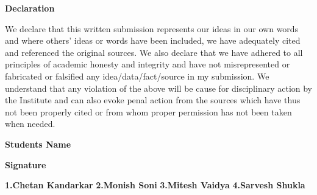 \newpage
\thispagestyle{empty}
\begin{center}
	\LARGE \textbf  {{Declaration}} 
\end{center}

\vspace{1.00cm}	
	We declare that this written submission represents our ideas in our own words and where others' ideas or words have been included, we have adequately cited and referenced the original sources. We also declare that we have adhered to all principles of academic honesty and integrity and have not misrepresented or fabricated or falsified any idea/data/fact/source in my submission. We understand that any violation of the above will be cause for disciplinary action by the Institute and can also evoke penal action from the sources which have thus not been properly cited or from whom proper permission has not been taken when needed. 
	
	\vspace{2.00cm}
	\begin{flushright}
		\begin{large} \textbf{ Students Name}\end{large} \hspace{20.00mm} \begin{large}\textbf{Signature}\end{large}
	\end{flushright}
	
	\begin{flushright} 
	\textbf{1.Chetan Kandarkar} \hspace{50.00mm}
		\vspace{0.3cm} 
	\linebreak \textbf{2.Monish Soni} \hspace{50.00mm}
		\vspace{0.3cm}
	\linebreak \textbf{3.Mitesh Vaidya}\hspace{50.00mm} 
		\vspace{0.3cm}
	\linebreak \textbf{4.Sarvesh Shukla}\hspace{50.00mm}
	\vspace{0.3cm}	    
	\end{flushright} 
	 